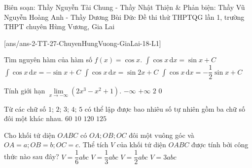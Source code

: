 	\begin{name}
{Biên soạn: Thầy Nguyễn Tài Chung - Thầy Nhật Thiện \&  Phản biện: Thầy Vũ Nguyễn Hoàng Anh - Thầy Dương Bùi Đức}
{Đề thi thử THPTQG lần 1, trường THPT chuyên Hùng Vương, Gia Lai}
\end{name}
\setcounter{ex}{0}\setcounter{bt}{0}
[ans/ans-2-TT-27-ChuyenHungVuong-GiaLai-18-L1]
\begin{ex}%
	Tìm nguyên hàm của hàm số $f(x)=\cos x$.
	\choice
	{\True $\displaystyle\int\limits {\cos x\mathrm{\,d}x=\sin x+C}$}
	{$\displaystyle\int\limits {\cos x\mathrm{\,d}x=-\sin x+C}$}
	{$\displaystyle\int\limits {\cos x\mathrm{\,d}x=\sin 2x+C}$}
	{$\displaystyle\int\limits {\cos x\mathrm{\,d}x=-\dfrac{1}{2}\sin x+C}$}
\end{ex}
\begin{ex}%
	Tính giới hạn $\lim \limits_{x \to  - \infty } (2x^3 - x^2 + 1)$.
	\choice
	{\True $-\infty $}
	{$+\infty $}
	{$2$}
	{$0$}
\end{ex}
\begin{ex}%
	Từ các chữ số $1$; $2$; $3$; $4$; $5$ có thể lập được bao nhiêu số tự nhiên gồm ba chữ số đôi một khác nhau. 
	\choice
	{\True $60$}
	{$10$}
	{$120$}
	{$125$}
\end{ex}
\begin{ex}%
	Cho khối tứ diện $OABC$ có $OA;OB;OC$ đôi một vuông góc và $OA=a;OB=b;OC=c$. Thể tích $V$ của khối tứ diện $OABC$ được tính bởi công thức nào sau đây?
	\choice
	{\True $V=\dfrac{1}{6}abc$}
	{$V=\dfrac{1}{3}abc$}
	{$V=\dfrac{1}{2}abc$}
	{$V=3abc$}
\end{ex}
